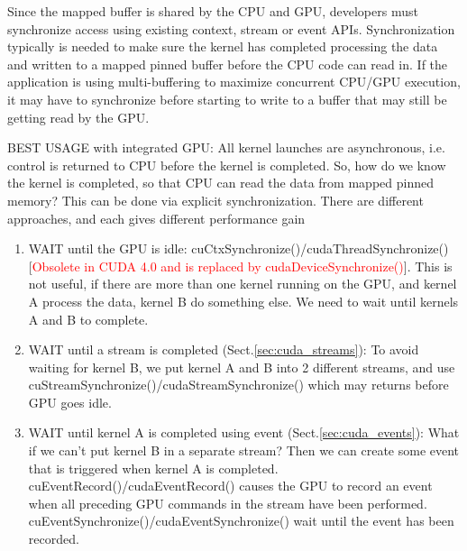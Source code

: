 \begin{framed}
Since the mapped buffer is shared by the CPU and GPU, developers must synchronize 
access using existing context, stream or event APIs. Synchronization typically is needed 
to make sure the kernel has completed processing the data and written to a
mapped pinned buffer before the CPU code can read in. If the application is
using multi-buffering to maximize concurrent CPU/GPU execution, it may have to
synchronize before starting to write to a buffer that may still be getting read
by the GPU. 
\end{framed}

BEST USAGE with integrated GPU: All kernel launches are asynchronous, i.e.
control is returned to CPU before the kernel is completed. So, how do we know
the kernel is completed, so that CPU can read the data from mapped pinned
memory? This can be done via explicit synchronization. There are different
approaches, and each gives different performance gain
\begin{enumerate}
  \item WAIT until the GPU is idle:  cuCtxSynchronize()/cudaThreadSynchronize()
  [\textcolor{red}{Obsolete in CUDA 4.0 and is replaced by
  cudaDeviceSynchronize()}].
  This is not useful, if there are more than one kernel running on the GPU, and
  kernel A process the data, kernel B do something else. We need to wait until
  kernels A and B to complete.
  
  \item WAIT until a stream is completed (Sect.\ref{sec:cuda_streams}): To avoid
  waiting for kernel B, we put kernel A and B into 2 different streams, and use
  cuStreamSynchronize()/cudaStreamSynchronize() which may returns before GPU
  goes idle.
  
  \item WAIT until kernel A is completed using event
  (Sect.\ref{sec:cuda_events}):
  What if we can't put kernel B in a separate stream? Then we can create some
  event that is triggered when kernel A is completed.
  cuEventRecord()/cudaEventRecord() causes the GPU to record an event when all
  preceding GPU commands in the stream have been performed.
  cuEventSynchronize()/cudaEventSynchronize() wait until the event has been
  recorded.
\end{enumerate}


